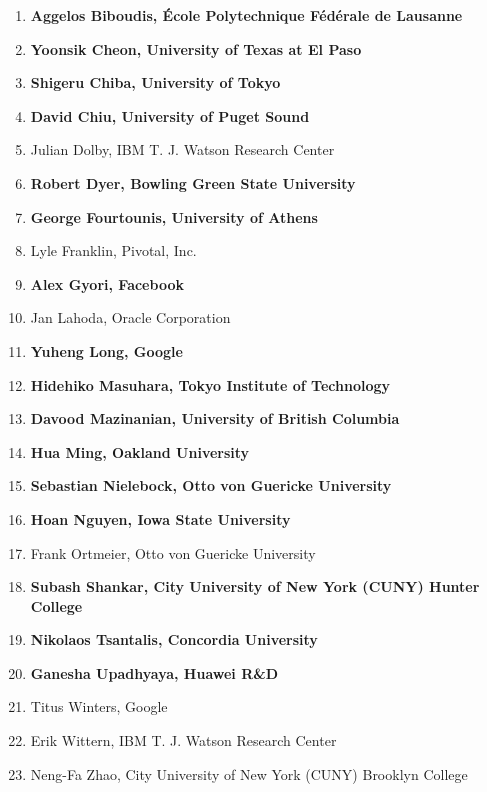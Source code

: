 \documentclass[10pt, conference]{IEEEtran}
\begin{document}
\begin{enumerate}

	\item \textbf{Aggelos Biboudis, École Polytechnique Fédérale de Lausanne}

	\item \textbf{Yoonsik Cheon, University of Texas at El Paso}

	\item \textbf{Shigeru Chiba, University of Tokyo}

	\item \textbf{David Chiu, University of Puget Sound}

	\item Julian Dolby, IBM T. J. Watson Research Center

	\item \textbf{Robert Dyer, Bowling Green State University}

	\item \textbf{George Fourtounis, University of Athens}

	\item Lyle Franklin, Pivotal, Inc.

	\item \textbf{Alex Gyori, Facebook}

	\item Jan Lahoda, Oracle Corporation

	\item \textbf{Yuheng Long, Google}

	\item \textbf{Hidehiko Masuhara, Tokyo Institute of Technology}

	\item \textbf{Davood Mazinanian, University of British Columbia}

	\item \textbf{Hua Ming, Oakland University}

	\item \textbf{Sebastian Nielebock, Otto von Guericke University}

	\item \textbf{Hoan Nguyen, Iowa State University}

	\item Frank Ortmeier, Otto von Guericke University

	\item \textbf{Subash Shankar, City University of New York (CUNY) Hunter College}

	\item \textbf{Nikolaos Tsantalis, Concordia University}

	\item \textbf{Ganesha Upadhyaya, Huawei R\&D}

	\item Titus Winters, Google

	\item Erik Wittern, IBM T. J. Watson Research Center

	\item Neng-Fa Zhao, City University of New York (CUNY) Brooklyn College

\end{enumerate}
\end{document}
